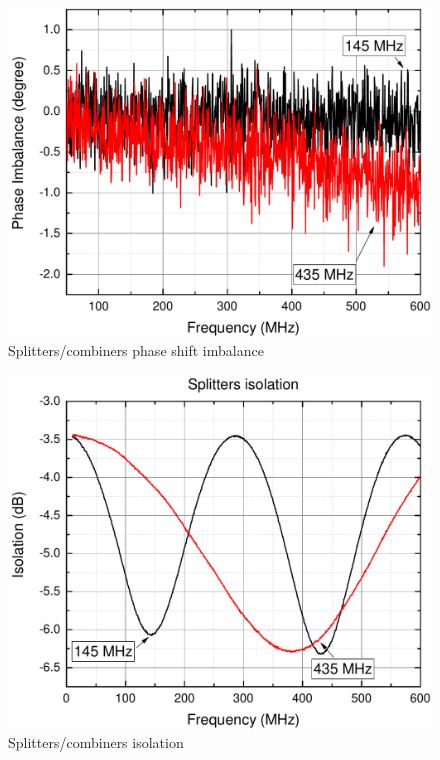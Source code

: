 \begin{figure}
    \centering
    \includegraphics[width=0.6\paperwidth]{img/7/splitter_phase.pdf}
    \caption{Splitters/combiners phase shift imbalance}
    \label{splitter_phase}
\end{figure}

\begin{figure}
    \centering
    \includegraphics[width=0.6\paperwidth]{img/7/splitter_isolation.pdf}
    \caption{Splitters/combiners isolation}
    \label{splitter_isolation}
\end{figure}


